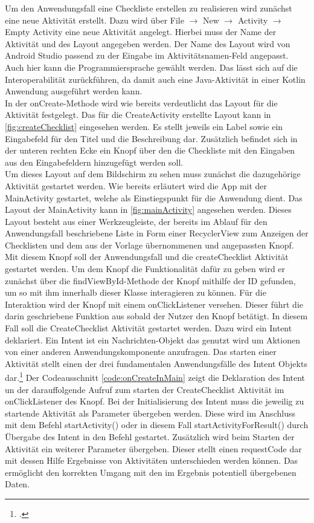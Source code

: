 Um den Anwendungsfall eine Checkliste erstellen zu realisieren wird zunächst eine neue Aktivität erstellt. Dazu wird über File $\rightarrow$ New $\rightarrow$ Activity $\rightarrow$ Empty Activity eine neue Aktivität angelegt. Hierbei muss der Name der Aktivität und des Layout angegeben werden. Der Name des Layout wird von Android Studio passend zu der Eingabe im Aktivitätsnamen-Feld angepasst. Auch hier kann die Programmiersprache gewählt werden. Das lässt sich auf die Interoperabilität zurückführen, da damit auch eine Java-Aktivität in einer Kotlin Anwendung ausgeführt werden kann.\\
In der onCreate-Methode wird wie bereits verdeutlicht das Layout für die Aktivität festgelegt. Das für die CreateActivity erstellte Layout kann in \autoref{fig:createChecklist} eingesehen werden. Es stellt jeweils ein Label sowie ein Eingabefeld für den Titel und die Beschreibung dar. Zusätzlich befindet sich in der unteren rechten Ecke ein Knopf über den die Checkliste mit den Eingaben aus den Eingabefeldern hinzugefügt werden soll.\\
Um dieses Layout auf dem Bildschirm zu sehen muss zunächst die dazugehörige Aktivität gestartet werden. Wie bereits erläutert wird die App mit der MainActivity gestartet, welche als Einstiegspunkt für die Anwendung dient. Das Layout der MainActivity kann in \autoref{fig:mainActivity} angesehen werden. Dieses Layout besteht aus einer Werkzeugleiste, der bereits im Ablauf für den Anwendungsfall beschriebene Liste in Form einer RecyclerView zum Anzeigen der Checklisten und dem aus der Vorlage übernommenen und angepassten Knopf. Mit diesem Knopf soll der Anwendungsfall und die createChecklist Aktivität gestartet werden. Um dem Knopf die Funktionalität dafür zu geben wird er zunächst über die findViewById-Methode der Knopf mithilfe der ID gefunden, um so mit ihm innerhalb dieser Klasse interagieren zu können. Für die Interaktion wird der Knopf mit einem onClickListener versehen. Dieser führt die darin geschriebene Funktion aus sobald der Nutzer den Knopf betätigt. In diesem Fall soll die CreateChecklist Aktivität gestartet werden. Dazu wird ein Intent deklariert. Ein Intent ist ein Nachrichten-Objekt das genutzt wird um Aktionen von einer anderen Anwendungskomponente anzufragen. Das starten einer Aktivität stellt einen der drei fundamentalen Anwendungsfälle des Intent Objekts dar.\footcite{Intents.2021} Der Codeausschnitt \autoref{code:onCreateInMain} zeigt die Deklaration des Intent un der darauffolgende Aufruf zum starten der CreateChecklist Aktivität im onClickListener des Knopf. Bei der Initialisierung des Intent muss die jeweilig zu startende Aktivität als Parameter übergeben werden. Diese wird im Anschluss mit dem Befehl startActivity() oder in diesem Fall startActivityForResult() durch Übergabe des Intent in den Befehl gestartet. Zusätzlich wird beim Starten der Aktivität ein weiterer Parameter übergeben. Dieser stellt einen requestCode dar mit dessen Hilfe Ergebnisse von Aktivitäten unterschieden werden können. Das ermöglicht den korrekten Umgang mit den im Ergebnis potentiell übergebenen Daten.
